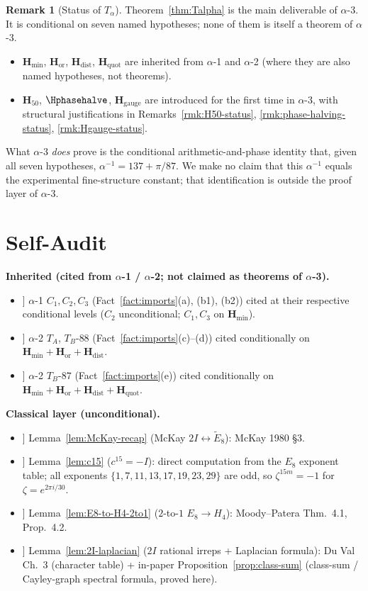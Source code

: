 \documentclass[11pt, a4paper]{amsart}
\theoremstyle{definition}
\newtheorem{remark}[theorem]{Remark}
\newcommand{\Hmin}{\mathbf{H}_{\min}}
\newcommand{\Hor}{\mathbf{H}_{\mathrm{or}}}
\newcommand{\Hdist}{\mathbf{H}_{\mathrm{dist}}}
\newcommand{\Hquot}{\mathbf{H}_{\mathrm{quot}}}
\newcommand{\Hfifty}{\mathbf{H}_{50}}
\newcommand{\Hgauge}{\mathbf{H}_{\mathrm{gauge}}}
\begin{document}
\begin{remark}[Status of $T_\alpha$]
\label{rmk:Talpha-status}
Theorem~\ref{thm:Talpha} is the main deliverable of
$\alpha$-3. It is conditional on seven named hypotheses;
none of them is itself a theorem of $\alpha$-3.
\begin{itemize}
\item $\Hmin$, $\Hor$, $\Hdist$, $\Hquot$ are inherited
  from $\alpha$-1 and $\alpha$-2 (where they are also
  named hypotheses, not theorems).
\item $\Hfifty$, $\Hphasehalve$, $\Hgauge$ are introduced
  for the first time in $\alpha$-3, with structural
  justifications in Remarks~\ref{rmk:H50-status},
  \ref{rmk:phase-halving-status}, \ref{rmk:Hgauge-status}.
\end{itemize}
What $\alpha$-3 \emph{does} prove is the conditional
arithmetic-and-phase identity that, given all seven
hypotheses, $\alpha^{-1} = 137 + \pi/87$. We make no claim
that this $\alpha^{-1}$ equals the experimental
fine-structure constant; that identification is outside the
proof layer of $\alpha$-3.
\end{remark}

\section{Self-Audit}
\label{sec:audit}

\textbf{Inherited (cited from $\alpha$-1 / $\alpha$-2;
not claimed as theorems of $\alpha$-3).}
\begin{itemize}
\item[[1]] $\alpha$-1 $C_1, C_2, C_3$
  (Fact~\ref{fact:imports}(a), (b1), (b2)) cited at their
  respective conditional levels ($C_2$ unconditional;
  $C_1, C_3$ on $\Hmin$).
\item[[2]] $\alpha$-2 $T_A$, $T_B$-$88$
  (Fact~\ref{fact:imports}(c)--(d)) cited conditionally on
  $\Hmin + \Hor + \Hdist$.
\item[[3]] $\alpha$-2 $T_B$-$87$
  (Fact~\ref{fact:imports}(e)) cited conditionally on
  $\Hmin + \Hor + \Hdist + \Hquot$.
\end{itemize}

\textbf{Classical layer (unconditional).}
\begin{itemize}
\item[[4]] Lemma~\ref{lem:McKay-recap} (McKay $2I
  \leftrightarrow \widetilde{E}_8$): McKay 1980 \S 3.
\item[[5]] Lemma~\ref{lem:c15} ($c^{15} = -I$): direct
  computation from the $E_8$ exponent table; all exponents
  $\{1, 7, 11, 13, 17, 19, 23, 29\}$ are odd, so $\zeta^{15
  m} = -1$ for $\zeta = e^{2\pi i/30}$.
\item[[6]] Lemma~\ref{lem:E8-to-H4-2to1} ($2$-to-$1$
  $E_8 \to H_4$): Moody--Patera Thm.~4.1, Prop.~4.2.
\item[[7]] Lemma~\ref{lem:2I-laplacian} ($2I$ rational
  irreps + Laplacian formula): Du Val Ch.~3 (character table)
  + in-paper Proposition~\ref{prop:class-sum} (class-sum /
  Cayley-graph spectral formula, proved here).
\end{itemize}
\end{document}
